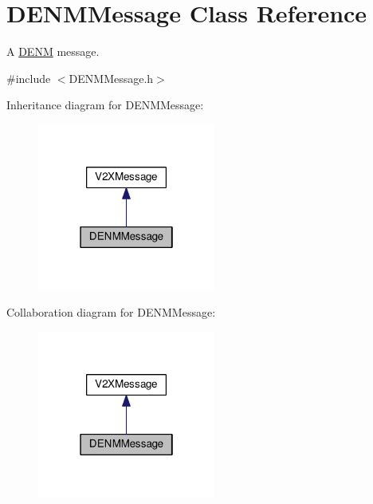 \hypertarget{classDENMMessage}{}\section{D\+E\+N\+M\+Message Class Reference}
\label{classDENMMessage}


A \hyperlink{structDENM}{D\+E\+NM} message.  




{\ttfamily \#include $<$D\+E\+N\+M\+Message.\+h$>$}



Inheritance diagram for D\+E\+N\+M\+Message\+:\nopagebreak
\begin{figure}[H]
\begin{center}
\leavevmode
\includegraphics[width=166pt]{classDENMMessage__inherit__graph}
\end{center}
\end{figure}


Collaboration diagram for D\+E\+N\+M\+Message\+:\nopagebreak
\begin{figure}[H]
\begin{center}
\leavevmode
\includegraphics[width=166pt]{classDENMMessage__coll__graph}
\end{center}
\end{figure}
